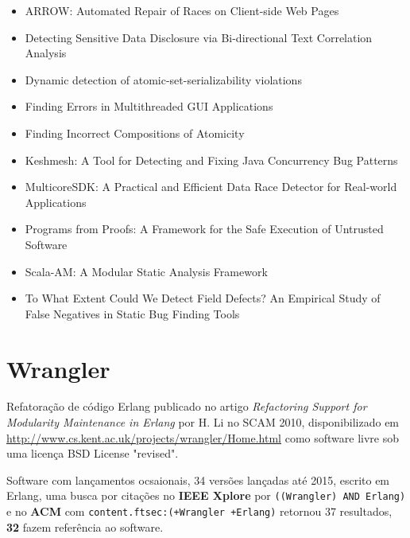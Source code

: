 \begin{itemize}
\item ARROW: Automated Repair of Races on Client-side Web Pages
\item Detecting Sensitive Data Disclosure via Bi-directional Text Correlation Analysis
\item Dynamic detection of atomic-set-serializability violations
\item Finding Errors in Multithreaded GUI Applications
\item Finding Incorrect Compositions of Atomicity
\item Keshmesh: A Tool for Detecting and Fixing Java Concurrency Bug Patterns
\item MulticoreSDK: A Practical and Efficient Data Race Detector for Real-world Applications
\item Programs from Proofs: A Framework for the Safe Execution of Untrusted Software
\item Scala-AM: A Modular Static Analysis Framework
\item To What Extent Could We Detect Field Defects? An Empirical Study of False Negatives in Static Bug Finding Tools
\end{itemize}

\section{Wrangler}

Refatoração de código Erlang
publicado no artigo {\it Refactoring Support for Modularity Maintenance in Erlang}
por H. Li
no SCAM 2010,
disponibilizado em \url{http://www.cs.kent.ac.uk/projects/wrangler/Home.html}
como software livre
sob uma licença BSD License "revised".

Software com lançamentos ocsaionais,
34 versões lançadas
até 2015,
escrito em Erlang,
uma busca por citações no {\bf IEEE Xplore} por
\texttt{((Wrangler) AND Erlang)}
e no {\bf ACM} com
\texttt{content.ftsec:(+Wrangler +Erlang)}
retornou
37 resultados,
{\bf 32} fazem referência ao software.

